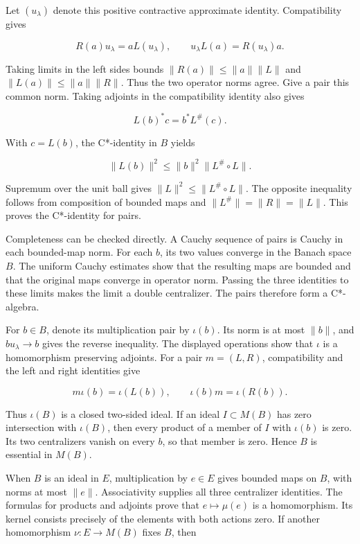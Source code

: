 \documentclass[
  11pt,
]{article}
\begin{document}
Let \((u_\lambda)\) denote this positive contractive approximate
identity. Compatibility gives

\[
R(a)u_\lambda=aL(u_\lambda),
\qquad
u_\lambda L(a)=R(u_\lambda)a.
\]

Taking limits in the left sides bounds \(\|R(a)\|\leq\|a\|\|L\|\) and
\(\|L(a)\|\leq\|a\|\|R\|\). Thus the two operator norms agree. Give a
pair this common norm. Taking adjoints in the compatibility identity
also gives

\[
L(b)^*c=b^*L^\#(c).
\]

With \(c=L(b)\), the C*-identity in \(B\) yields

\[
\|L(b)\|^2
\leq\|b\|^2\|L^\#\circ L\|.
\]

Supremum over the unit ball gives \(\|L\|^2\leq\|L^\#\circ L\|\). The
opposite inequality follows from composition of bounded maps and
\(\|L^\#\|=\|R\|=\|L\|\). This proves the C*-identity for pairs.

Completeness can be checked directly. A Cauchy sequence of pairs is
Cauchy in each bounded-map norm. For each \(b\), its two values converge
in the Banach space \(B\). The uniform Cauchy estimates show that the
resulting maps are bounded and that the original maps converge in
operator norm. Passing the three identities to these limits makes the
limit a double centralizer. The pairs therefore form a C*-algebra.

For \(b\in B\), denote its multiplication pair by \(\iota(b)\). Its norm
is at most \(\|b\|\), and \(bu_\lambda\to b\) gives the reverse
inequality. The displayed operations show that \(\iota\) is a
homomorphism preserving adjoints. For a pair \(m=(L,R)\), compatibility
and the left and right identities give

\[
m\iota(b)=\iota(L(b)),
\qquad
\iota(b)m=\iota(R(b)).
\]

Thus \(\iota(B)\) is a closed two-sided ideal. If an ideal
\(I\subset M(B)\) has zero intersection with \(\iota(B)\), then every
product of a member of \(I\) with \(\iota(b)\) is zero. Its two
centralizers vanish on every \(b\), so that member is zero. Hence \(B\)
is essential in \(M(B)\).

When \(B\) is an ideal in \(E\), multiplication by \(e\in E\) gives
bounded maps on \(B\), with norms at most \(\|e\|\). Associativity
supplies all three centralizer identities. The formulas for products and
adjoints prove that \(e\mapsto\mu(e)\) is a homomorphism. Its kernel
consists precisely of the elements with both actions zero. If another
homomorphism \(\nu:E\to M(B)\) fixes \(B\), then
\end{document}
